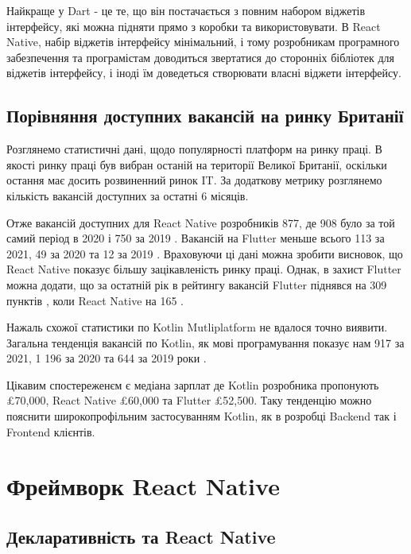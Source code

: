 Найкраще у Dart - це те, що він постачається з повним набором віджетів інтерфейсу, які можна підняти прямо з коробки та використовувати.
В React Native, набір віджетів інтерфейсу мінімальний, і тому розробникам програмного забезпечення та програмістам доводиться звертатися до сторонніх бібліотек для віджетів інтерфейсу, і іноді їм доведеться створювати власні віджети інтерфейсу.

\subsection{Порівняння доступних вакансій на ринку Британії}
\label{subsec:market_comparisson}
Розглянемо статистичні дані, щодо популярності платформ на ринку праці.
В якості ринку праці був вибран останій на території Великої Британії, оскільки остання має досить розвиненний ринок IT.
За додаткову метрику розглянемо кількість вакансій доступних за остатні 6 місяців.

Отже вакансій доступних для React Native розробників 877, де 908 було за той самий період в 2020 і 750 за 2019 \cite{react_native_jobs}.
Вакансій на Flutter меньше всього 113 за 2021, 49 за 2020 та 12 за 2019 \cite{flutter_jobs}.
Враховуючи ці дані можна зробити висновок, що React Native показує більшу зацікавленість ринку праці.
Однак, в захист Flutter можна додати, що за остатній рік в рейтингу вакансій Flutter піднявся на 309 пунктів \cite{flutter_jobs}, коли React Native на 165 \cite{react_native_jobs}.

Нажаль схожої статистики по Kotlin Mutliplatform не вдалося точно виявити.
Загальна тенденція вакансій по Kotlin, як мові програмування показує нам 917 за 2021, 1 196 за 2020 та 644 за 2019 роки \cite{kotlin_jobs}.

Цікавим спостереженєм є медіана зарплат де Kotlin розробника пропонують £70,000\cite{kotlin_jobs}, React Native £60,000\cite{react_native_jobs} та Flutter £52,500\cite{flutter_jobs}.
Таку тенденцію можно пояснити широкопрофільним застосуванням Kotlin, як в розробці Backend так і Frontend клієнтів.


\section{Фреймворк React Native}
\label{sec:rn}

\subsection{Декларативність та React Native}
\label{subsec:rn_declarative}


